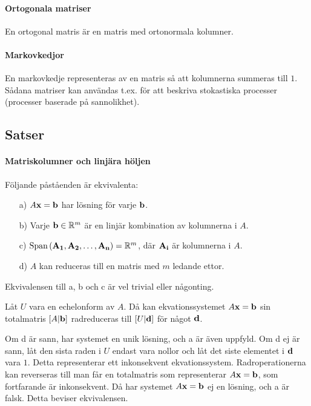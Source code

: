 \paragraph{Ortogonala matriser}
En ortogonal matris är en matris med ortonormala kolumner.

\paragraph{Markovkedjor}
En markovkedje representeras av en matris så att kolumnerna summeras till $1$. Sådana matriser kan användas t.ex. för att beskriva stokastiska processer (processer baserade på sannolikhet).

\subsection{Satser}

\paragraph{Matriskolumner och linjära höljen}
Följande påståenden är ekvivalenta:
\begin{itemize}
	\item[a)] $A\vect{x} = \vect{b}$ har lösning för varje $\vect{b}$.
	\item[b)] Varje $\vect{b}\in \R^{m}$ är en linjär kombination av kolumnerna i $A$.
	\item[c)] $\Span{\vect{A_1}, \vect{A_2}, \dots, \vect{A_n}} = \R^m$, där $\vect{A_i}$ är kolumnerna i $A$.
	\item[d)] $A$ kan reduceras till en matris med $m$ ledande ettor.
\end{itemize}

\proof
Ekvivalensen till a, b och c är vel trivial eller någonting.

Låt $U$ vara en echelonform av $A$. Då kan ekvationssystemet $A\vect{x} = \vect{b}$ sin totalmatris $[A | \vect{b}]$ radreduceras till $[U | \vect{d}]$ för något $\vect{d}$.

Om d är sann, har systemet en unik lösning, och a är även uppfyld. Om d ej är sann, låt den sista raden i $U$ endast vara nollor och låt det siste elementet i $\vect{d}$ vara $1$. Detta representerar ett inkonsekvent ekvationssystem. Radroperationerna kan reverseras till man får en totalmatris som representerar $A\vect{x} = \vect{b}$, som fortfarande är inkonsekvent. Då har systemet $A\vect{x} = \vect{b}$ ej en lösning, och a är falsk. Detta beviser ekvivalensen.

